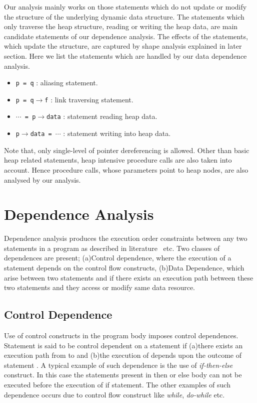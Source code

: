 Our analysis mainly works on those statements which do not update or modify the 
structure of the underlying dynamic data structure. The statements which only traverse the heap structure,   
reading or writing the heap data, are main candidate statements of our dependence analysis. The effects of the statements, which update 
the structure, are captured by shape analysis explained in later section. 
Here we list the statements which 
are handled by our data dependence analysis.
\begin{itemize}
\item {\tt p = q} : aliasing statement.
\item {\tt p = q$\rightarrow$f} : link traversing statement.
\item {\tt $\cdots$ = p$\rightarrow$data} : statement reading heap data.
\item {\tt p$\rightarrow$data = $\cdots$} : statement writing into heap data.
\end{itemize}
Note that, only single-level of pointer dereferencing is allowed. Other 
than basic heap related statements, heap intensive procedure calls are 
also taken into account. Hence procedure calls, whose parameters point 
to heap nodes,  are also analysed by our analysis.
\section{Dependence Analysis}
Dependence analysis produces the execution order constraints 
between any two statements in a program as described in 
literature~\cite{Muchnick97, Kennedy01Optimizing, Cooper05} etc. 
Two classes of dependences 
are present; (a)Control dependence, where the execution of
a statement depends on the control flow constructs, (b)Data Dependence, 
which arise between two statements  and  if there exists an 
execution path between these two statements and they access or 
modify same data resource. 
\subsection{Control Dependence}
Use of control constructs in the program body imposes control dependences.  
Statement  is said to be control dependent on a statement  if 
(a)there exists an execution path from  to  and (b)the execution 
of  depends upon the outcome of statement . A typical example of such  
dependence is the use of \emph{if-then-else} construct. 
In this case the statements present 
in then or else body can not be executed before the execution of if statement. The 
other examples of such dependence occurs due to control flow construct like 
\emph{while}, \emph{do-while} etc. 

